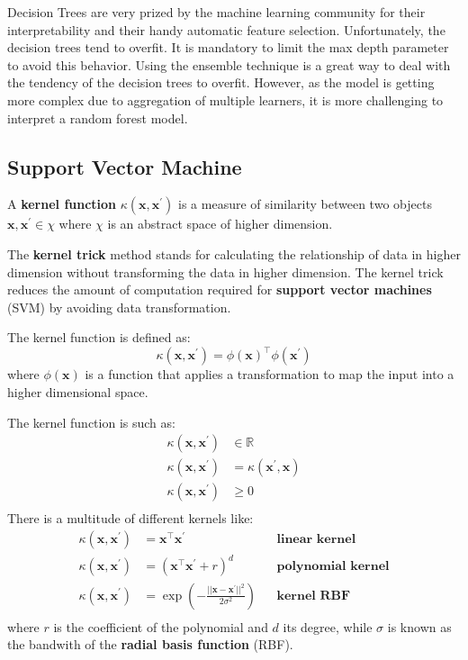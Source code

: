 \documentclass[12pt]{report}
\begin{document}
            Decision Trees are very prized by the machine learning community for their interpretability and their handy automatic feature selection. Unfortunately, the decision trees tend to overfit. It is mandatory to limit the max depth parameter to avoid this behavior. Using the ensemble technique is a great way to deal with the tendency of the decision trees to overfit. However, as the model is getting more complex due to aggregation of multiple learners, it is more challenging to interpret a random forest model.
            
    \subsection{Support Vector Machine}
        A \textbf{kernel function} $\kappa(\boldsymbol{x}, \boldsymbol{x^{'}})$ is a measure of similarity between two objects $\boldsymbol{x}, \boldsymbol{x^{'}} \in \chi$ where $\chi$ is an abstract space of higher dimension. 
        
        The \textbf{kernel trick} method stands for calculating the relationship of data in higher dimension without transforming the data in higher dimension. The kernel trick reduces the amount of computation required for \textbf{support vector machines} (SVM) by avoiding data transformation.
        
        The kernel function is defined as:
        \begin{equation}
            \kappa(\boldsymbol{x}, \boldsymbol{x}^{'}) = \phi(\boldsymbol{x})^\top \phi(\boldsymbol{x}^{'})
        \end{equation}
        where $\phi(\boldsymbol{x})$ is a function that applies a transformation to map the input into a higher dimensional space.
        
        The kernel function is such as:
        \begin{align}
            \kappa(\boldsymbol{x}, \boldsymbol{x^{'}}) &\in \mathbb{R} \\
            \kappa(\boldsymbol{x}, \boldsymbol{x}^{'}) &= \kappa(\boldsymbol{x}^{'}, \boldsymbol{x}) \\
            \kappa(\boldsymbol{x}, \boldsymbol{x^{'}}) &\geq 0 \\
        \end{align}
        There is a multitude of different kernels like:
        \begin{align}
            \kappa(\boldsymbol{x}, \boldsymbol{x^{'}}) &= \boldsymbol{x}^\top \boldsymbol{x}^{'} && \textbf{linear kernel} \\
            \kappa(\boldsymbol{x}, \boldsymbol{x^{'}}) &= \left(\boldsymbol{x}^\top \boldsymbol{x^{'}} + r\right)^d && \textbf{polynomial kernel} \\
            \kappa(\boldsymbol{x}, \boldsymbol{x^{'}}) &= \exp\left(-\frac{|| \boldsymbol{x} -  \boldsymbol{x^{'}} ||^2}{2\sigma^{2}}\right) && \textbf{kernel RBF} \\
        \end{align}
        where $r$ is the coefficient of the polynomial and $d$ its degree, while $\sigma$ is known as the bandwith of the \textbf{radial basis function} (RBF).
        
\end{document}
